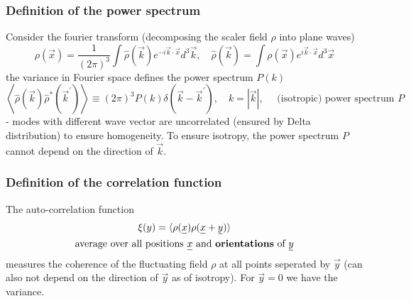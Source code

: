 \subsubsection{Definition of the power spectrum}
Consider the fourier transform (decomposing the scaler field $\rho$ into plane waves)
\begin{equation}
    \rho(\vec{x})=\frac{1}{(2 \pi)^3} \int \hat{\rho}(\vec{k}) e^{-i \vec{k} \cdot \vec{x}} d^3 \vec{k}, \quad \hat{\rho}(\vec{k})=\int \rho(\vec{x}) e^{i \vec{k} \cdot \vec{x}} d^3 \vec{x}
\end{equation}
the variance in Fourier space defines the power spectrum $P(k)$
\begin{equation}
    \label{eq:powerspectrum}
    \left\langle\hat{\rho}(\vec{k}) \hat{\rho}^*\left(\vec{k}^{\prime}\right)\right\rangle \equiv(2 \pi)^3 P(k) \delta\left(\vec{k}-\vec{k}^{\prime}\right), \quad k=|\vec{k}|, \quad \text { (isotropic) power spectrum } P
\end{equation}
- modes with different wave vector are uncorrelated (ensured by Delta distribution) to ensure homogeneity. To ensure
isotropy, the power spectrum $P$ cannot depend on the direction of $\vec{k}$.


\subsubsection{Definition of the correlation function}
The auto-correlation function
\begin{equation}
    \begin{gathered}
        \xi(y)=\langle\rho(\vec{x}) \rho(\vec{x}+\vec{y})\rangle \\
        \text{average over all positions } \vec{x} \text{ and \textbf{orientations} of } \vec{y}
    \end{gathered}
\end{equation}
measures the coherence of the fluctuating field $\rho$ at all
points seperated by $\vec{y}$ (can also not depend on the
direction of $\vec{y}$ as of isotropy). For $\vec{y} = 0$ we have the variance.

